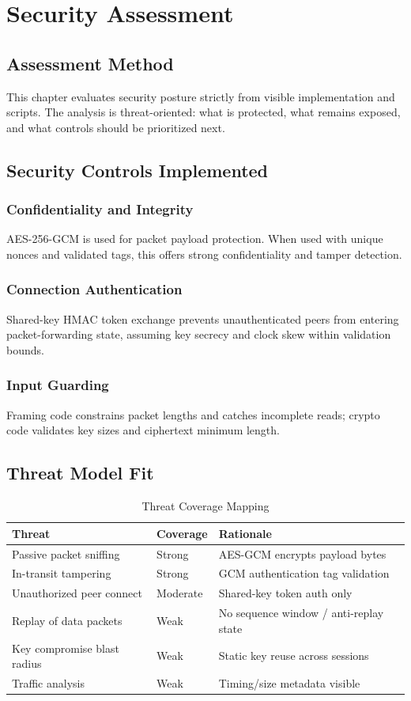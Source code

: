 \chapter{Security Assessment}

\section{Assessment Method}
This chapter evaluates security posture strictly from visible implementation and scripts. The analysis is threat-oriented: what is protected, what remains exposed, and what controls should be prioritized next.

\section{Security Controls Implemented}
\subsection{Confidentiality and Integrity}
AES-256-GCM is used for packet payload protection. When used with unique nonces and validated tags, this offers strong confidentiality and tamper detection.

\subsection{Connection Authentication}
Shared-key HMAC token exchange prevents unauthenticated peers from entering packet-forwarding state, assuming key secrecy and clock skew within validation bounds.

\subsection{Input Guarding}
Framing code constrains packet lengths and catches incomplete reads; crypto code validates key sizes and ciphertext minimum length.

\section{Threat Model Fit}
\begin{table}[H]
\centering
\caption{Threat Coverage Mapping}
\begin{tabular}{p{}p{}p{}}
\toprule
\textbf{Threat} & \textbf{Coverage} & \textbf{Rationale} \\
\midrule
Passive packet sniffing & Strong & AES-GCM encrypts payload bytes \\
In-transit tampering & Strong & GCM authentication tag validation \\
Unauthorized peer connect & Moderate & Shared-key token auth only \\
Replay of data packets & Weak & No sequence window / anti-replay state \\
Key compromise blast radius & Weak & Static key reuse across sessions \\
Traffic analysis & Weak & Timing/size metadata visible \\
\bottomrule
\end{tabular}
\end{table}


